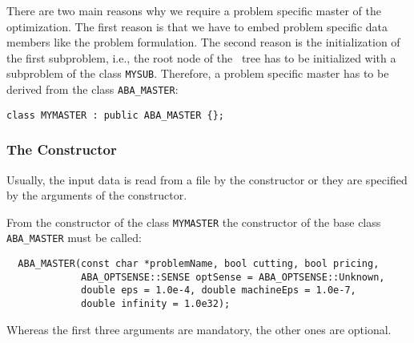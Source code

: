 There are two main reasons why we require a problem specific master 
of the optimization. The first reason is that we have to embed
problem specific data members like the problem formulation.
The second reason is the initialization of the first subproblem, i.e., the
root node of the \bab\ tree has to be initialized with a subproblem
of the class {\tt MYSUB}. Therefore, a problem specific master
has to be derived from the class {\tt ABA\_MASTER}:
\begin{verbatim}
class MYMASTER : public ABA_MASTER {};
\end{verbatim}

\subsubsection{The Constructor}

Usually, the input data is read from a file by the constructor or they are
specified by the arguments of the constructor. 

From the constructor of the class {\tt MYMASTER} the constructor of the base 
class {\tt ABA\_MASTER} must be called:
\begin{verbatim}
  ABA_MASTER(const char *problemName, bool cutting, bool pricing,
             ABA_OPTSENSE::SENSE optSense = ABA_OPTSENSE::Unknown,
             double eps = 1.0e-4, double machineEps = 1.0e-7,
             double infinity = 1.0e32);
\end{verbatim}
Whereas the first three arguments are mandatory, the other ones are
optional.

